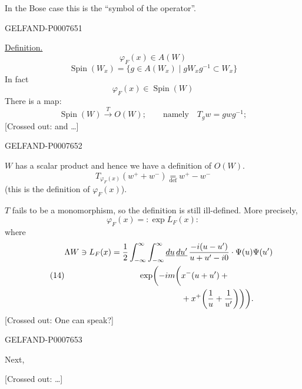 In the Bose case this is the “symbol of the operator”.


\begin{GelfandAdjacentEvidence}{GELFAND-P000765}{1}

\underline{Definition.}
\[
\varphi_F(x)\in A(W)
\]
\[
\operatorname{Spin}(W_x)=\{g\in A(W_x)\mid gW_xg^{-1}\subset W_x\}
\]
In fact
\[
\varphi_F(x)\in\operatorname{Spin}(W)
\]
There is a map:
\begin{equation*}
\tag{11}
\operatorname{Spin}(W)\overset{T}{\longrightarrow}O(W);
\qquad\text{namely}\quad T_gw=gwg^{-1};
\end{equation*}
[Crossed out: and …]
\end{GelfandAdjacentEvidence}
\begin{GelfandAdjacentEvidence}{GELFAND-P000765}{2}


\(W\) has a scalar product and hence we have a definition of \(O(W)\).
\begin{equation*}
\tag{12}
T_{\varphi_F(x)}(w^++w^-)\underset{\mathrm{def}}{=}w^+-w^-
\end{equation*}
(this is the definition of \(\varphi_F(x)\)).

\(T\) fails to be a monomorphism, so the definition is still ill-defined. More precisely,
\begin{equation*}
\tag{13}
\varphi_F(x)={:}\exp L_F(x){:}
\end{equation*}
where
\begin{equation*}
\tag{14}
\begin{aligned}
\Lambda W\ni L_F(x)={}&
\frac12\int_{-\infty}^{\infty}\int_{-\infty}^{\infty}
\underline{du}\,\underline{du'}\,\frac{-i(u-u')}{u+u'-i0}\cdot
\Psi(u)\Psi(u')\\
&{}\qquad\exp\biggl(-im\biggl(x^-(u+u')+{}\\
&\hphantom{{}\qquad\exp\biggl(-im\biggl(}{}+
x^+\biggl(\frac1u+\frac1{u'}\biggr)\biggr)\biggr).
\end{aligned}
\end{equation*}
[Crossed out: One can speak?]
\end{GelfandAdjacentEvidence}
\begin{GelfandAdjacentEvidence}{GELFAND-P000765}{3}


Next,

[Crossed out: …]
\end{GelfandAdjacentEvidence}
